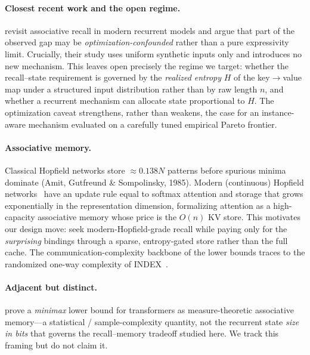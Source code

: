 \paragraph{Closest recent work and the open regime.}
\citet{okpekpe2025revisiting} revisit associative recall in modern recurrent models and argue
that part of the observed gap may be \emph{optimization-confounded} rather than a pure
expressivity limit. Crucially, their study uses uniform synthetic inputs only and introduces no
new mechanism. This leaves open precisely the regime we target: whether the recall--state
requirement is governed by the \emph{realized entropy} $H$ of the key$\rightarrow$value map
under a structured input distribution rather than by raw length $n$, and whether a recurrent
mechanism can allocate state proportional to $H$. The optimization caveat strengthens, rather
than weakens, the case for an instance-aware mechanism evaluated on a carefully tuned empirical
Pareto frontier.

\paragraph{Associative memory.}
Classical Hopfield networks store $\approx 0.138N$ patterns before spurious minima dominate
(Amit, Gutfreund \& Sompolinsky, 1985). Modern (continuous) Hopfield
networks~\citep{ramsauer2021hopfield} have an update rule equal to softmax attention and storage
that grows exponentially in the representation dimension, formalizing attention as a
high-capacity associative memory whose price is the $O(n)$ KV store. This motivates our design
move: seek modern-Hopfield-grade recall while paying only for the \emph{surprising} bindings
through a sparse, entropy-gated store rather than the full cache. The communication-complexity
backbone of the lower bounds traces to the randomized one-way complexity of
INDEX~\citep{kremer1999randomized}.

\paragraph{Adjacent but distinct.}
\citet{kawata2026measure} prove a \emph{minimax} lower bound for transformers as
measure-theoretic associative memory---a statistical / sample-complexity quantity, not the
recurrent state \emph{size in bits} that governs the recall--memory tradeoff studied here. We
track this framing but do not claim it.
